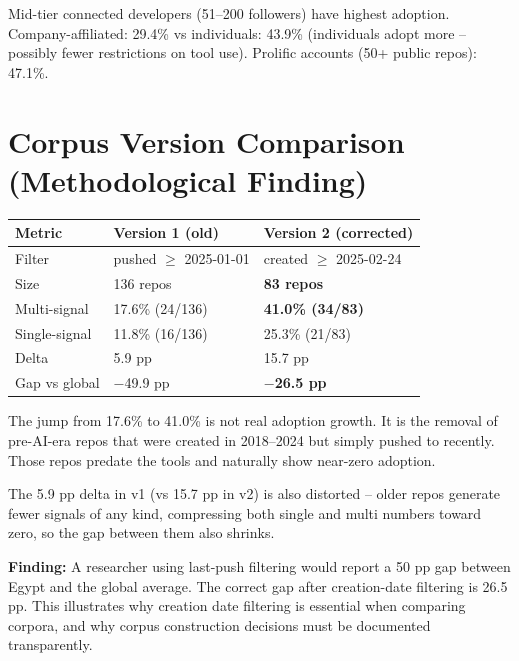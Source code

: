 \documentclass[12pt,a4paper]{article}
\begin{document}
Mid-tier connected developers (51--200 followers) have highest adoption. Company-affiliated: 29.4\% vs individuals: 43.9\% (individuals adopt more -- possibly fewer restrictions on tool use). Prolific accounts (50+ public repos): 47.1\%.

\section{Corpus Version Comparison (Methodological Finding)}
\label{sec:corpusversion}

\begin{table}[h]
\centering
\begin{tabular}{@{}lll@{}}
\toprule
Metric & Version 1 (old) & Version 2 (corrected) \\
\midrule
Filter             & pushed $\geq$ 2025-01-01 & created $\geq$ 2025-02-24 \\
Size               & 136 repos & \textbf{83 repos} \\
Multi-signal       & 17.6\% (24/136) & \textbf{41.0\% (34/83)} \\
Single-signal      & 11.8\% (16/136) & 25.3\% (21/83) \\
Delta              & 5.9 pp & 15.7 pp \\
Gap vs global      & $-$49.9 pp & \textbf{$-$26.5 pp} \\
\bottomrule
\end{tabular}
\end{table}

The jump from 17.6\% to 41.0\% is not real adoption growth. It is the removal of pre-AI-era repos that were created in 2018--2024 but simply pushed to recently. Those repos predate the tools and naturally show near-zero adoption.

The 5.9 pp delta in v1 (vs 15.7 pp in v2) is also distorted -- older repos generate fewer signals of any kind, compressing both single and multi numbers toward zero, so the gap between them also shrinks.

\textbf{Finding:} A researcher using last-push filtering would report a 50 pp gap between Egypt and the global average. The correct gap after creation-date filtering is 26.5 pp. This illustrates why creation date filtering is essential when comparing corpora, and why corpus construction decisions must be documented transparently.

\end{document}
